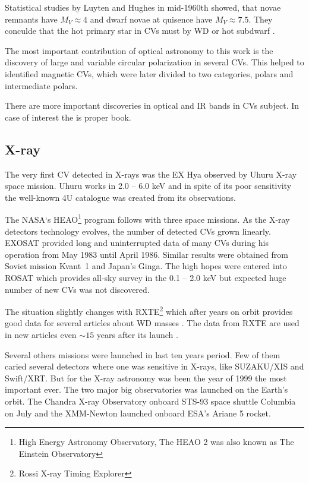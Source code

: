 \documentclass[oneside,a4paper,11pt]{report}
\begin{document}
Statistical studies by Luyten and Hughes in mid-1960th showed, that novae remnants have $M_V \approx 4$ and 
dwarf novae at quisence have $M_V \approx 7.5$. They conculde that the hot primary star in CVs must by WD or 
 hot subdwarf \citet{warner:1}.   

The most important contribution of optical astronomy to this work is the discovery of large and 
variable circular polarization in several CVs. This helped to identified magnetic CVs, 
which were later divided to two categories, polars and intermediate polars.

There are more important discoveries in optical and IR bands in CVs subject. In case of interest the 
 \citet{warner:1} is proper book. 
   
   
\subsection{X-ray}
The very first CV detected in X-rays was the EX Hya observed by Uhuru X-ray space mission. 
Uhuru  works in 2.0 – 6.0 keV and in spite of its poor sensitivity the well-known 4U catalogue
 was created \citet{1978ApJS...38..357F} from its observations.

The NASA`s HEAO\footnote{High Energy Astronomy Observatory, The HEAO 2 was also known as 
The Einstein Observatory} program follows with three space missions. As the X-ray detectors 
technology evolves, the number of detected CVs grown linearly. \mbox{EXOSAT} provided long and 
uninterrupted data of many CVs during his operation from May 1983 until April 1986. 
Similar results were obtained from Soviet mission \mbox{Kvant 1} and Japan's Ginga.
The high hopes were entered into ROSAT which provides all-sky survey in the
 0.1 – 2.0 keV but expected huge number of new CVs was not discovered. 

The situation slightly changes with RXTE\footnote{Rossi X-ray Timing Explorer} which after 
years on orbit provides good data for several articles about WD masses \citet{2005A&A...435..191S}. 
The data from RXTE are used in new articles even $\sim15$ years after its launch \citet{2011A&A...526A..77B}.
 
Several others missions were launched in last ten years period. Few of them caried several 
detectors where one was sensitive in X-rays, like SUZAKU/XIS and Swift/XRT. But for the X-ray 
astronomy was been the year of 1999 the most important ever. The two major big observatories 
was launched on the Earth's orbit. The Chandra X-ray Observatory onboard STS-93 space shuttle 
Columbia on July and the XMM-Newton launched onboard ESA's Ariane 5 rocket.     
\end{document}
